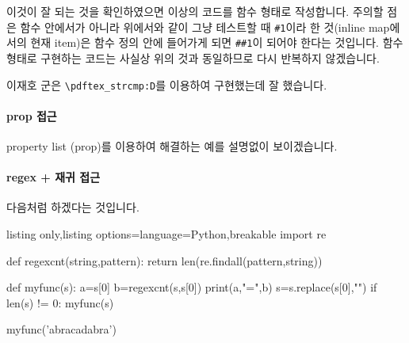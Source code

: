 \documentclass[a4paper,amsmath]{oblivoir}
\begin{document}
이것이 잘 되는 것을 확인하였으면 이상의 코드를 함수 형태로 작성합니다. 주의할 점은 함수 안에서가 아니라 위에서와 같이 그냥 테스트할 때 \verb|#1|이라 한 것(inline map에서의 현재 item)은 함수 정의 안에 들어가게 되면 \verb|##1|이 되어야 한다는 것입니다. 함수 형태로 구현하는 코드는 사실상 위의 것과 동일하므로 다시 반복하지 않겠습니다.

이재호 군은 \verb|\pdftex_strcmp:D|를 이용하여 구현했는데 잘 했습니다. 

\paragraph{prop 접근}

property list (\textsf{prop})를 이용하여 해결하는 예를 설명없이 보이겠습니다.


\paragraph{regex + 재귀 접근}

다음처럼 하겠다는 것입니다.
\begin{tcblisting}{listing only,listing options={language=Python},breakable}
import re

def regexcnt(string,pattern):
    return len(re.findall(pattern,string))

def myfunc(s):
    a=s[0]
    b=regexcnt(s,s[0])
    print(a,"=",b)
    s=s.replace(s[0],"")
    if len(s) != 0:
        myfunc(s)
        
myfunc('abracadabra')
\end{tcblisting}
\end{document}
